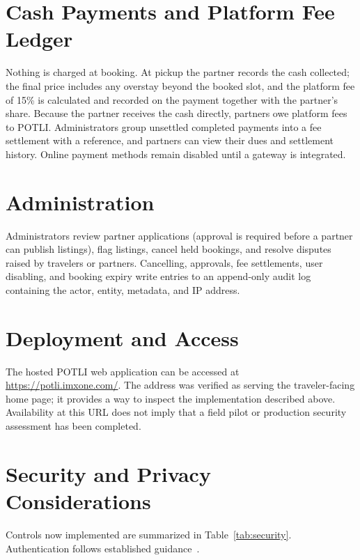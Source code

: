 \documentclass{tietreport}
\begin{document}
\section{Cash Payments and Platform Fee Ledger}
Nothing is charged at booking. At pickup the partner records the cash collected; the final price includes any overstay beyond the booked slot, and the platform fee of 15\% is calculated and recorded on the payment together with the partner's share. Because the partner receives the cash directly, partners owe platform fees to POTLI. Administrators group unsettled completed payments into a fee settlement with a reference, and partners can view their dues and settlement history. Online payment methods remain disabled until a gateway is integrated.

\section{Administration}
Administrators review partner applications (approval is required before a partner can publish listings), flag listings, cancel held bookings, and resolve disputes raised by travelers or partners. Cancelling, approvals, fee settlements, user disabling, and booking expiry write entries to an append-only audit log containing the actor, entity, metadata, and IP address.

\section{Deployment and Access}
The hosted POTLI web application can be accessed at \url{https://potli.imxone.com/}. The address was verified as serving the traveler-facing home page; it provides a way to inspect the implementation described above. Availability at this URL does not imply that a field pilot or production security assessment has been completed.

\section{Security and Privacy Considerations}
Controls now implemented are summarized in Table~\ref{tab:security}. Authentication follows established guidance~\cite{owasp-auth}.
\end{document}
